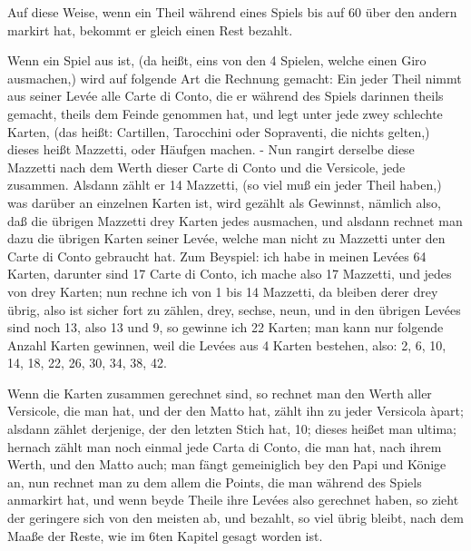 \documentclass[11pt,a6paper,twoside]{article}
\begin{document}
Auf diese Weise, wenn ein Theil während eines Spiels bis auf 60 über den andern markirt hat, bekommt er gleich einen Rest bezahlt.

Wenn ein Spiel aus ist, (da heißt, eins von den 4 Spielen, welche einen Giro ausmachen,) wird auf folgende Art die Rechnung gemacht: Ein jeder Theil nimmt aus seiner Levée alle Carte di Conto, die er während des Spiels darinnen theils gemacht, theils dem Feinde genommen hat, und legt unter jede zwey schlechte Karten, (das heißt: Cartillen, Tarocchini oder Sopraventi, die nichts gelten,) dieses heißt Mazzetti, oder Häufgen machen. - Nun rangirt derselbe diese Mazzetti nach dem Werth dieser Carte di Conto und die Versicole, jede zusammen. Alsdann zählt er 14 Mazzetti, (so viel muß ein jeder Theil haben,) was darüber an einzelnen Karten ist, wird gezählt als Gewinnst, nämlich also, daß die übrigen Mazzetti drey Karten jedes ausmachen, und alsdann rechnet man dazu die übrigen Karten seiner Levée, welche man nicht zu Mazzetti unter den Carte di Conto gebraucht hat. Zum Beyspiel: ich habe in meinen Levées 64 Karten, darunter sind 17 Carte di Conto, ich mache also 17 Mazzetti, und jedes von drey Karten; nun rechne ich von 1 bis 14 Mazzetti, da bleiben derer drey übrig, also ist sicher fort zu zählen, drey, sechse, neun, und in den übrigen Levées sind noch 13, also 13 und 9, so gewinne ich 22 Karten; man kann nur folgende Anzahl Karten gewinnen, weil die Levées aus 4 Karten bestehen, also: 2, 6, 10, 14, 18, 22, 26, 30, 34, 38, 42.

Wenn die Karten zusammen gerechnet sind, so rechnet man den Werth aller Versicole, die man hat, und der den Matto hat, zählt ihn zu jeder Versicola àpart; alsdann zählet derjenige, der den letzten Stich hat, 10; dieses heißet man ultima; hernach zählt man noch einmal jede Carta di Conto, die man hat, nach ihrem Werth, und den Matto auch; man fängt gemeiniglich bey den Papi und Könige an, nun rechnet man zu dem allem die Points, die man während des Spiels anmarkirt hat, und wenn beyde Theile ihre Levées also gerechnet haben, so zieht der geringere sich von den meisten ab, und bezahlt, so viel übrig bleibt, nach dem Maaße der Reste, wie im 6ten Kapitel gesagt worden ist.
\end{document}
